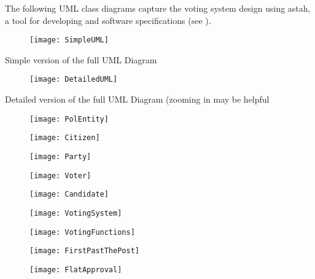\documentclass[12pt]{article}
\begin{document}
The following UML class diagrams capture the voting system design using astah, a tool for developing and software specifications (see \cite{astah}).

\begin{centering}
\begin{figure}[H]
\centering
\texttt{[image: SimpleUML]}
\end{figure}
\footnotesize Simple version of the full UML Diagram

\begin{figure}[H]
\centering
\texttt{[image: DetailedUML]}
\end{figure}
Detailed version of the full UML Diagram (zooming in may be helpful

\begin{figure}[H]
\centering
\texttt{[image: PolEntity]}
\end{figure}

\begin{figure}[H]
\centering
\texttt{[image: Citizen]}
\end{figure}

\begin{figure}[H]
\centering
\texttt{[image: Party]}
\end{figure}

\begin{figure}[H]
\centering
\texttt{[image: Voter]}
\end{figure}

\begin{figure}[H]
\centering
\texttt{[image: Candidate]}
\end{figure}

\begin{figure}[H]
\centering
\texttt{[image: VotingSystem]}
\end{figure}

\begin{figure}[H]
\centering
\texttt{[image: VotingFunctions]}
\end{figure}

\begin{figure}[H]
\centering
\texttt{[image: FirstPastThePost]}
\end{figure}

\begin{figure}[H]
\centering
\texttt{[image: FlatApproval]}
\end{figure}


\end{centering}
\end{document}

